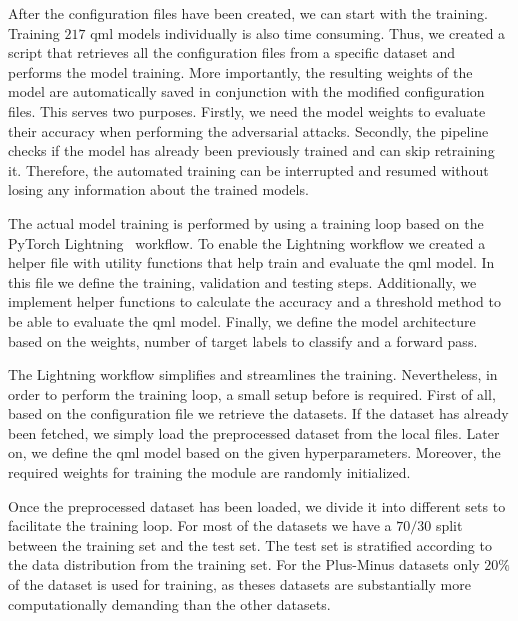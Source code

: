 After the configuration files have been created,
we can start with the training. Training \(217\)
\ac{qml} models individually is also time consuming.
Thus, we created a script that retrieves all
the configuration files from a specific dataset
and performs the model training. More importantly,
the resulting weights of the model are automatically
saved in conjunction with the modified configuration
files. This serves two purposes. Firstly, we need the model
weights to evaluate their accuracy when performing the
adversarial attacks. Secondly, the pipeline checks
if the model has already been previously trained and
can skip retraining it. Therefore, the automated training
can be interrupted and resumed without losing any information
about the trained models. \

The actual model training is performed by using a training loop
based on the PyTorch Lightning~\cite{falcon_pytorch_2019} workflow.
To enable the Lightning workflow we created a helper file with
utility functions that help train and evaluate the \ac{qml} model.
In this file we define the training, validation and testing steps.
Additionally, we implement helper functions to calculate the 
accuracy and a threshold method to be able to evaluate the \ac{qml}
model. Finally, we define the model architecture based on the
weights, number of target labels to classify and a forward pass. \

The Lightning workflow simplifies and streamlines the training.
Nevertheless, in order to perform the training loop, a small
setup before is required. First of all, based on the configuration
file we retrieve the datasets. If the dataset has already been
fetched, we simply load the preprocessed dataset from the local files.
Later on, we define the \ac{qml} model based on the given hyperparameters.
Moreover, the required weights for training the module are randomly
initialized. \


Once the preprocessed dataset has been loaded, we divide it into
different sets to facilitate the training loop. For most of
the datasets we have a \(70/30\) split between the training
set and the test set. The test set is stratified according
to the data distribution from the training set. For the
Plus-Minus datasets only \(20\%\) of the dataset
is used for training, as theses datasets are substantially
more computationally demanding than the other datasets. \

